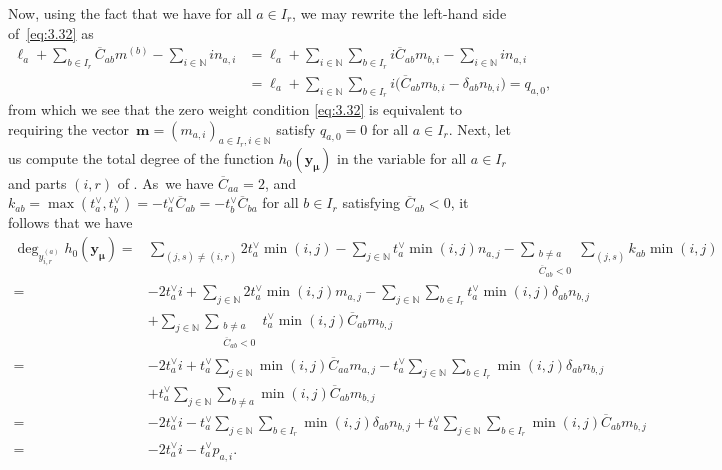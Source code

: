\documentclass[pdftex]{sigma}
\numberwithin{equation}{section}
\begin{document}
Now, using the fact that we have  for all $a\in I_r$, we may rewrite the left-hand side of~\eqref{eq:3.32} as
\begin{align*}
\ell_a+\sum_{b\in I_r}\overline{C}_{ab} m^{(b)}-\sum_{i\in \mathbb{N}}in_{a,i}
&=\ell_a+\sum_{i\in\mathbb{N}}\sum_{b\in I_r}i\overline{C}_{ ab} m_{b,i}-\sum_{i\in\mathbb{N}}in_{a,i}\\
&=\ell_a+\sum_{i\in\mathbb{N}}\sum_{b\in I_r}i\bigl(\overline{C}_{ ab} m_{b,i}-\delta_{ab}n_{b,i}\bigr)=q_{a,0},
\end{align*}
from which we see that the zero weight condition \eqref{eq:3.32} is equivalent to requiring the vector~${\mathbf{m}=(m_{a,i})_{a\in I_r,i\in\mathbb{N}}}$ satisfy $q_{a,0}=0$ for all $a\in I_r$.
Next, let us compute the total degree  of the function $h_0(\mathbf{ y}_{\bm{\mu}})$ in the variable  for all $a\in I_r$ and parts $(i,r)$ of . As~we have $\overline{C}_{aa}=2$, and $k_{ab}=\max(t_a^{\vee},t_b^{\vee})=-t_a^{\vee}\overline{C}_{ab}=-t_b^{\vee}\overline{C}_{ba}$ for all $b\in I_r$ satisfying $\overline{C}_{ab}<0$, it follows that we have
\begin{align}
\deg_{y_{i,r}^{(a)}} h_0(\mathbf{y}_{\bm{\mu}})
={}&\sum_{(j,s)\neq(i,r)}2t_a^{\vee}\min(i,j)-\sum_{j\in\mathbb{N}} t_a^{\vee}\min(i,j)n_{a,j}-\sum_{\substack{b\neq a\\ \overline{C}_{ab}<0}}\sum_{(j,s)}k_{ab}\min(i,j)\nonumber\\
={}&-2t_a^{\vee}i+\sum_{j\in\mathbb{N}}2t_a^{\vee}\min(i,j)m_{a,j}-\sum_{j\in\mathbb{N}}\sum_{b\in I_r}t_a^{\vee}\min(i,j)\delta_{ab}n_{b,j}\nonumber\\
&+\sum_{j\in\mathbb{N}}\sum_{\substack{b\neq a\\ \overline{C}_{ab}<0}}t_a^{\vee}\min(i,j)\overline{C}_{ab}m_{b,j} \nonumber\\
={}&-2t_a^{\vee}i+t_a^{\vee}\sum_{j\in\mathbb{N}}\min(i,j)\overline{C}_{aa}m_{a,j}-t_a^{\vee}\sum_{j\in\mathbb{N}}\sum_{b\in I_r}\min(i,j)\delta_{ab}n_{b,j}\nonumber\\
&+t_a^{\vee}\sum_{j\in\mathbb{N}}\sum_{b\neq a}\min(i,j) \overline{C}_{ab}m_{b,j}\nonumber\\
={}&-2t_a^{\vee}i-t_a^{\vee}\sum_{j\in\mathbb{N}}\sum_{b\in I_r}\min(i,j)\delta_{ab}n_{b,j}+t_a^{\vee}\sum_{j\in\mathbb{N}}\sum_{b\in I_r}\min(i,j)\overline{C}_{ab}m_{b,j}\nonumber\\
={}&-2t_a^{\vee}i-t_a^{\vee}p_{a,i}.\label{eq:3.50}
\end{align}
\end{document}
